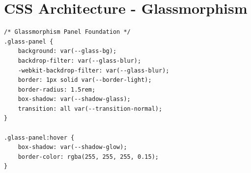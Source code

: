\documentclass[12pt,a4paper]{report}
\begin{document}
\section{CSS Architecture - Glassmorphism}
\begin{lstlisting}[language=html]
/* Glassmorphism Panel Foundation */
.glass-panel {
    background: var(--glass-bg);
    backdrop-filter: var(--glass-blur);
    -webkit-backdrop-filter: var(--glass-blur);
    border: 1px solid var(--border-light);
    border-radius: 1.5rem;
    box-shadow: var(--shadow-glass);
    transition: all var(--transition-normal);
}

.glass-panel:hover {
    box-shadow: var(--shadow-glow);
    border-color: rgba(255, 255, 255, 0.15);
}
\end{lstlisting}
\end{document}
